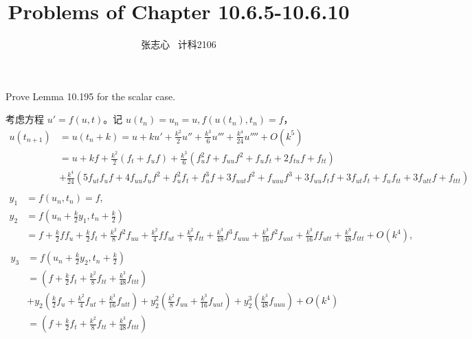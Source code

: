 \documentclass[lang=cn,a4paper,newtx,bibend=bibtex]{elegantpaper}
\title{Problems of Chapter 10.6.5-10.6.10}
\author{张志心 \ 计科2106}
\date{\zhdate{2024/05/14}}
\begin{document}
\maketitle

\begin{prob}[Exercise 10.196]
  Prove Lemma 10.195 for the scalar case.
\end{prob}

\begin{solution}
  考虑方程 $u' = f(u, t)$。记 $u(t_n) = u_n = u, f(u(t_n), t_n) = f$，
  \begin{equation*}
    \begin{aligned}
      u(t_{n+1}) & = u(t_n + k) = u + ku' + \frac{k^2}2 u'' + \frac{k^3}6 u''' + \frac {k^4}{24} u'''' + O(k^5) & \\
      & = u + kf + \frac{k^2}2(f_t + f_uf) + 
      \frac{k^3}6(f_u^2f + f_{uu}f^2 + f_uf_t + 2f_{tu}f + f_{tt}) & \\
      & + \frac{k^4}{24}(5f_{ut}f_uf + 4f_{uu}f_uf^2 + f_u^2f_t + f_u^3f + 3f_{uut}f^2 + f_{uuu}f^3 + 3f_{uu}f_tf + 3f_{ut}f_t + f_uf_{tt} + 3f_{utt}f + f_{ttt}) & \\
    \end{aligned}
  \end{equation*}
  \begin{equation*}
    \begin{aligned}
      y_1 & = f(u_n, t_n) = f, & \\
      y_2 & = f(u_n + \frac k2 y_1, t_n + \frac k2) & \\
      & = f + \frac k2 ff_u + \frac k2 f_t + \frac {k^2}8f^2f_{uu} + \frac {k^2}4ff_{ut} + \frac {k^2}8f_{tt}
      + \frac{k^3}{48}f^3f_{uuu} + \frac{k^3}{16}f^2f_{uut} + \frac{k^3}{16}ff_{utt} + \frac{k^3}{48}f_{ttt} + O(k^4), & \\
    \end{aligned}
  \end{equation*}
  \begin{equation*}
    \begin{aligned}
      y_3 & = f(u_n + \frac k2 y_2, t_n + \frac k2) & \\
      & = (f + \frac k2 f_t + \frac {k^2}8 f_{tt} + \frac{k^3}{48} f_{ttt}) & \\
      & + y_2(\frac k2 f_u + \frac {k^2}4 f_{ut} + \frac {k^3}{16} f_{utt})
      + y_2^2(\frac {k^2}8 f_{uu} + \frac {k^3}{16} f_{uut})
      + y_2^3(\frac {k^3}{48} f_{uuu}) + O(k^4) & \\
      & = (f + \frac k2 f_t + \frac {k^2}8 f_{tt} + \frac{k^3}{48} f_{ttt}) & \\

\end{aligned}
\end{equation*}
\end{solution}
\end{document}
